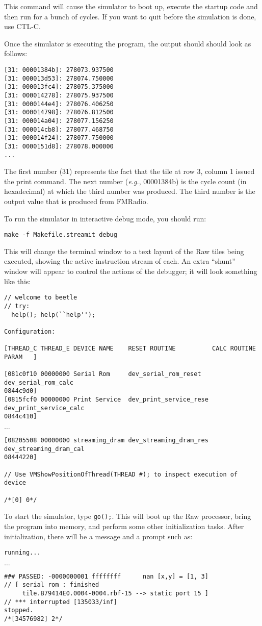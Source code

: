 This command will cause the simulator to boot up, execute the startup
code and then run for a bunch of cycles. If you want to quit before
the simulation is done, use CTL-C.

Once the simulator is executing the program, the output should should
look as follows:
{\small
\begin{verbatim}
[31: 00001384b]: 278073.937500
[31: 000013d53]: 278074.750000
[31: 000013fc4]: 278075.375000
[31: 000014278]: 278075.937500
[31: 0000144e4]: 278076.406250
[31: 000014798]: 278076.812500
[31: 000014a04]: 278077.156250
[31: 000014cb8]: 278077.468750
[31: 000014f24]: 278077.750000
[31: 0000151d8]: 278078.000000
...
\end{verbatim}
}
The first number (31) represents the fact that the tile at row 3,
column 1 issued the print command. The next number ({\it e.g.},
00001384b) is the cycle count (in hexadecimal) at which the third
number was produced. The third number is the output value that is
produced from FMRadio.

 To run the simulator in interactive debug
mode, you should run:
\begin{verbatim}
make -f Makefile.streamit debug
\end{verbatim}
This will change the terminal window to a text layout of the Raw
tiles being executed, showing the active instruction stream of each.
An extra ``shunt'' window will appear to control the actions of the
debugger; it will look something like this:
{\scriptsize
\begin{verbatim}
// welcome to beetle
// try: 
  help(); help(``help'');

Configuration: 

[THREAD_C THREAD_E DEVICE NAME    RESET ROUTINE          CALC ROUTINE           
PARAM   ]

[081c0f10 00000000 Serial Rom     dev_serial_rom_reset   dev_serial_rom_calc    
0844c9d0]
[0815fcf0 00000000 Print Service  dev_print_service_rese dev_print_service_calc 
0844c410]
\end{verbatim}
$\dots$
\begin{verbatim}
[08205508 00000000 streaming_dram dev_streaming_dram_res dev_streaming_dram_cal 
08444220]

// Use VMShowPositionOfThread(THREAD #); to inspect execution of device 

/*[0] 0*/ 
\end{verbatim}
}

To start the simulator, type {\tt go();}.  This will boot up the Raw
processor, bring the program into memory, and perform some other
initialization tasks.  After initialization, there will be a message
and a prompt such as:
{\small
\begin{verbatim}
running...
\end{verbatim}
$\dots$
\begin{verbatim}
### PASSED: -0000000001 ffffffff      nan [x,y] = [1, 3]
// [ serial rom : finished 
     tile.B79414E0.0004-0004.rbf-15 --> static port 15 ]
// *** interrupted [135033/inf]
stopped.
/*[34576982] 2*/ 
\end{verbatim}
}

